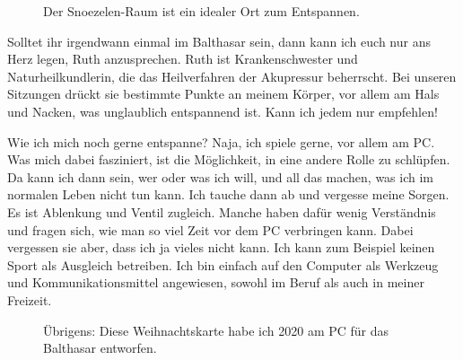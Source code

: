 \documentclass[fontsize=14pt,a4paper,headinclude,DIV=calc,automark]{scrbook}
\begin{document}
\setlength{\fboxsep}{0pt}    %
\setlength{\fboxrule}{0.2pt} %
\begin{figure}[ht]
    \raggedright
    \caption{Der Snoezelen-Raum ist ein idealer Ort zum Entspannen.}
    \label{fig:snoezelen_raum}
\end{figure}

Solltet ihr irgendwann einmal im Balthasar sein, dann kann ich euch nur ans Herz legen, Ruth anzusprechen. Ruth ist Krankenschwester und Naturheilkundlerin, die das Heilverfahren der Akupressur beherrscht. Bei unseren Sitzungen drückt sie bestimmte Punkte an meinem Körper, vor allem am Hals und Nacken, was unglaublich entspannend ist. Kann ich jedem nur empfehlen!

Wie ich mich noch gerne entspanne? Naja, ich spiele gerne, vor allem am PC. Was mich dabei fasziniert, ist die Möglichkeit, in eine andere Rolle zu schlüpfen. Da kann ich dann sein, wer oder was ich will, und all das machen, was ich im normalen Leben nicht tun kann. Ich tauche dann ab und vergesse meine Sorgen. Es ist Ablenkung und Ventil zugleich. Manche haben dafür wenig Verständnis und fragen sich, wie man so viel Zeit vor dem PC verbringen kann. Dabei vergessen sie aber, dass ich ja vieles nicht kann. Ich kann zum Beispiel keinen Sport als Ausgleich betreiben. Ich bin einfach auf den Computer als Werkzeug und Kommunikationsmittel angewiesen, sowohl im Beruf als auch in meiner Freizeit.

\setlength{\fboxsep}{0pt}    %
\setlength{\fboxrule}{0.2pt} %
\begin{figure}[ht]
    \raggedright
    \caption{Übrigens: Diese Weihnachtskarte habe ich 2020 am PC für das Balthasar entworfen.}
    \label{fig:weihnachtskarte}
\end{figure}
\end{document}
